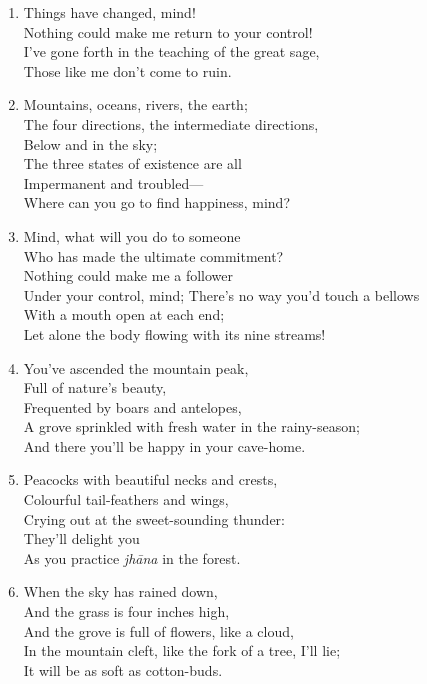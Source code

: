 \documentclass[10pt, openany]{book}
\begin{document}
\begin{enumerate}
\item Things have changed, mind!\\
Nothing could make me return to your control!\\
I’ve gone forth in the teaching of the great sage,\\
Those like me don’t come to ruin.

\item Mountains, oceans, rivers, the earth;\\
The four directions, the intermediate directions, \\
Below and in the sky;\\
The three states of existence are all \\
Impermanent and troubled—\\
Where can you go to find happiness, mind?

\item Mind, what will you do to someone\\
Who has made the ultimate commitment?\\
Nothing could make me a follower\\
Under your control, mind;
There’s no way you’d touch a bellows\\
With a mouth open at each end;\\
Let alone the body flowing with its nine streams!

\item You’ve ascended the mountain peak, \\
Full of nature’s beauty,\\
Frequented by boars and antelopes,\\
A grove sprinkled with fresh water in the rainy-season;\\
And there you’ll be happy in your cave-home.

\item Peacocks with beautiful necks and crests,\\
Colourful tail-feathers and wings,\\
Crying out at the sweet-sounding thunder:\\
They’ll delight you \\
As you practice \emph{jhāna} in the forest.

\item When the sky has rained down,\\
And the grass is four inches high,\\
And the grove is full of flowers, like a cloud,\\
In the mountain cleft, like the fork of a tree, I’ll lie;\\
It will be as soft as cotton-buds.


\end{enumerate}
\end{document}
